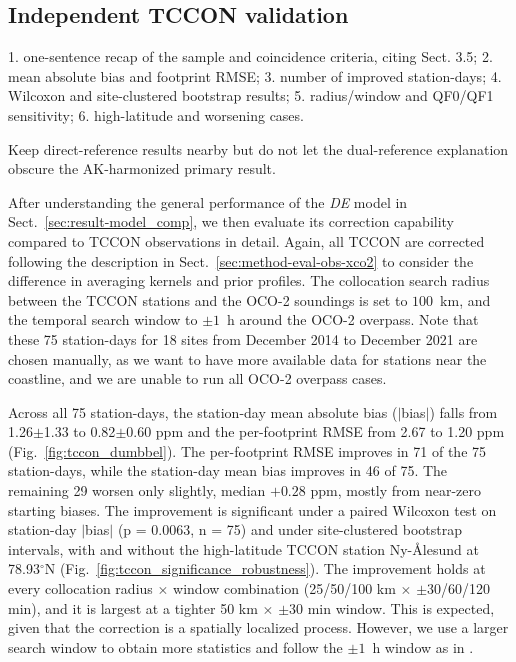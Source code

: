 \subsection{Independent TCCON validation}
\label{sec:result-tccon_val}




1. one-sentence recap of the sample and coincidence criteria, citing
   Sect. 3.5;
2. mean absolute bias and footprint RMSE;
3. number of improved station-days;
4. Wilcoxon and site-clustered bootstrap results;
5. radius/window and QF0/QF1 sensitivity;
6. high-latitude and worsening cases.

Keep direct-reference results nearby but do not let the dual-reference
explanation obscure the AK-harmonized primary result.


After understanding the general performance of the \emph{DE} model in Sect.~\ref{sec:result-model_comp}, we then evaluate its correction capability compared to TCCON observations in detail. Again, all TCCON \xco are corrected following the description in Sect.~\ref{sec:method-eval-obs-xco2} to consider the difference in averaging kernels and prior profiles. The collocation search radius between the TCCON stations and the OCO-2 soundings is set to $100$~km, and the temporal search window to $\pm1$~h around the OCO-2 overpass. Note that these 75 station-days for 18 sites from December 2014 to December 2021 are chosen manually, as we want to have more available data for stations near the coastline, and we are unable to run all OCO-2 overpass cases.


Across all 75 station-days, the station-day mean absolute bias ($|$bias$|$) falls from 1.26$\pm$1.33 to 0.82$\pm$0.60 ppm and the per-footprint RMSE from 2.67 to 1.20 ppm (Fig.~\ref{fig:tccon_dumbbel}). The per-footprint RMSE improves in 71 of the 75 station-days, while the station-day mean bias improves in 46 of 75. The remaining 29 worsen only slightly, median $+0.28$ ppm, mostly from near-zero starting biases. The improvement is significant under a paired Wilcoxon test on station-day $|$bias$|$ (p = 0.0063, n = 75) and under site-clustered bootstrap intervals, with and without the high-latitude TCCON station Ny-Ålesund at 78.93$^\circ$N (Fig.~\ref{fig:tccon_significance_robustness}). The improvement holds at every collocation radius $\times$ window combination (25/50/100 km $\times$ $\pm$30/60/120 min), and it is largest at a tighter 50 km $\times$ $\pm$30 min window. This is expected, given that the correction is a spatially localized process. However, we use a larger search window to obtain more statistics and follow the $\pm1$~h window as in \citet{das2025oco2_v111_tccon_ggg2020}.

